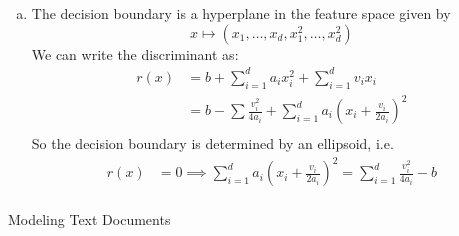 \documentclass{amsart}
\theoremstyle{definition}
\begin{document}
\begin{enumerate}[(a)]
		When $a_i > 0$, then $s_+[i] = 1$ and $\mu_+[i] = 0$. Thus, we have:
		\begin{align*}
			a_i &= \frac{1}{2}(s_-[i]^{-1} - 1)\\
			\implies s_-[i] &= \frac{1}{1+2a_i}\\
			v_i &= \frac{\mu_{+}[i]}{s_+[i]} = (1 + 2a_i)\mu_{+}[i]\\
			\mu_{+}[i] &= \frac{v_i}{1+2a_i}\\
		\end{align*}
		To summarize:
		\begin{align*}
			\mu_+[i] &= [[a_i > 0]]\frac{v_i}{1 + 2a_i}\\
			\mu_-[i] &= [[a_i < 0]](-v_i(1 - 2a_i))\\
			s_+[i]&= (1-2a_i)^{-[[a_i < 0]]}\\
			s_-[i]&= (1+2a_i)^{-[[a_i > 0]]}\\
		\end{align*}
		Now we can solve for $p_+$. 
		\begin{align*}
			&\log\frac{p_+}{1-p_+} + \frac{1}{2}\sum_{i=1}^{d}\frac{1}{(1+2a_i)}^{[[a_i > 0]]} - \frac{1}{(1-2a_i)}^{-[[a_i < 0]]} + [[a_i > 0]]\frac{v_i^2(1-2a_i)^{[[a_i < 0]]}}{(1+2a_i)^{2}} - [[a_i < 0]]v_i^2 (1-2a_i)^2(1+2a_i)^{[[a_i > 0]]}\\
			b&= \log\frac{p_+}{1-p_+} + \frac12 \sum_{i=1}^{d} (1 + 2a_i)^{-[[a_i > 0]]} - (1 - 2a_i)^{-[[a_i < 0]]} +[[a_i > 0]]\frac{v_i^2}{(1+2a_i)^2} - [[a_i < 0]]v_i^2(1-2a_i)^2\\
			\frac{p_+}{1-p_+} &= \exp\left(b - \frac12 \left(\sum_{i=1}^{d} (1 + 2a_i)^{-[[a_i > 0]]} - (1 - 2a_i)^{-[[a_i < 0]]} +[[a_i > 0]]\frac{v_i^2}{(1+2a_i)^2} - [[a_i < 0]]v_i^2(1-2a_i)^2\right)\right)\\
			p_+ &= \frac{1}{1 + \exp\left(-b + \frac12 \left(\sum_{i=1}^{d} (1 + 2a_i)^{-[[a_i > 0]]} - (1 - 2a_i)^{-[[a_i < 0]]} +[[a_i > 0]]\frac{v_i^2}{(1+2a_i)^2} - [[a_i < 0]]v_i^2(1-2a_i)^2\right)\right)}\\
		\end{align*}
	\item
		The decision boundary is a hyperplane in the feature space given by 
		\[x \mapsto (x_1, \ldots, x_d, x_1^2, \ldots, x_d^2)\]
		We can write the discriminant as:
		\begin{align*}
			r(x) &= b + \sum_{i=1}^{d}a_ix_i^2 + \sum_{i=1}^{d}v_ix_i\\
			&= b - \sum \frac{v_i^2}{4a_i} + \sum_{i=1}^{d}a_i\left(x_i + \frac{v_i}{2a_i}\right)^2\\
		\end{align*}
		So the decision boundary is determined by an ellipsoid, i.e. 
		\begin{align*}
			r(x) &= 0 \implies \sum_{i=1}^{d}a_i\left(x_i + \frac{v_i}{2a_i}\right)^2 = \sum_{i =1 }^{d} \frac{v_i^2}{4a_i} - b\\
		\end{align*}
\end{enumerate}
\begin{center}
\LARGE Modeling Text Documents
\end{center}
\end{document}
